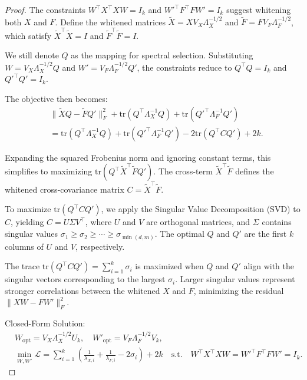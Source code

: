 \documentclass{article}
\begin{document}
\begin{proof}
    

The constraints \( W^\top X^\top X W = I_k \) and \( W'^\top F^\top F W' = I_k \) suggest whitening both \( X \) and \( F \). Define the whitened matrices \( \tilde{X} = X V_X\Lambda_X^{-1/2} \) and \( \tilde{F} = F V_F\Lambda_F^{-1/2} \), which satisfy \( \tilde{X}^\top \tilde{X} = I \) and \( \tilde{F}^\top \tilde{F} = I \). 

We still denote $Q$ as the mapping for spectral selection. Substituting \( W = V_X\Lambda_X^{-1/2} Q \) and \( W' = V_F\Lambda_F^{-1/2} Q' \), the constraints reduce to \( Q^\top Q = I_k \) and \( Q'^\top Q' = I_k \).  

The objective then becomes:  
\begin{equation}
\begin{aligned}
& \| \tilde{X} Q - \tilde{F} Q' \|_F^2 + \text{tr}(Q^\top \Lambda_X^{-1} Q) + \text{tr}(Q'^\top \Lambda_F^{-1} Q') \\
&  = \text{tr}\left(Q^\top \Lambda_X^{-1} Q\right) + \text{tr}\left(Q'^\top \Lambda_F^{-1} Q'\right) - 2 \text{tr}(Q^\top C Q') + 2k.
\end{aligned}
\end{equation}  

Expanding the squared Frobenius norm and ignoring constant terms, this simplifies to maximizing \( \text{tr}(Q^\top \tilde{X}^\top \tilde{F} Q') \). The cross-term \( \tilde{X}^\top \tilde{F} \) defines the whitened cross-covariance matrix \( C = \tilde{X}^\top \tilde{F} \).  

To maximize \( \text{tr}(Q^\top C Q') \), we apply the Singular Value Decomposition (SVD) to \( C \), yielding \( C = U \Sigma V^\top \), where \( U \) and \( V \) are orthogonal matrices, and \( \Sigma \) contains singular values \( \sigma_1 \geq \sigma_2 \geq \cdots \geq \sigma_{\min(d,m)} \). The optimal \( Q \) and \( Q' \) are the first \( k \) columns of \( U \) and \( V \), respectively.  


The trace \( \text{tr}(Q^\top C Q') = \sum_{i=1}^k \sigma_i \) is maximized when \( Q \) and \( Q' \) align with the singular vectors corresponding to the largest \( \sigma_i \). Larger singular values represent stronger correlations between the whitened \( X \) and \( F \), minimizing the residual \( \|XW - FW'\|_F^2 \).  

Closed-Form Solution:  
\begin{equation}
\begin{aligned}
& W_{\text{opt}} = V_X\Lambda_X^{-1/2} U_k, \quad W'_{\text{opt}} = V_F\Lambda_F^{-1/2} V_k, \\
& \min_{W, W'} \mathcal{L} = \sum_{i=1}^{k} ( \frac{1}{\lambda_{X,i}} + \frac{1}{\lambda_{F,i}} - 2 \sigma_i ) + 2k \quad \text{s.t.} \quad W^\top X^\top X W = W'^\top F^\top F W' = I_k.
\end{aligned}
\end{equation}  


\end{proof}
\end{document}
